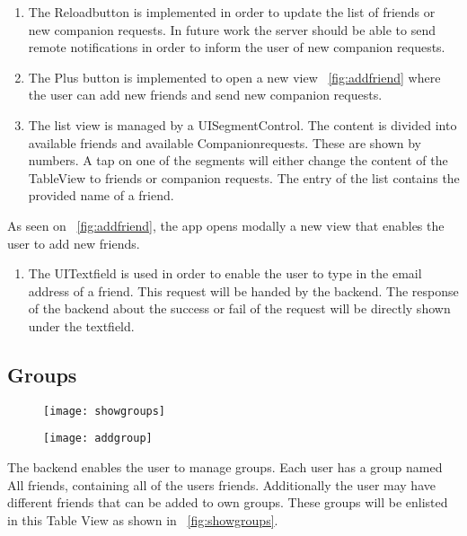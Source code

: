 \begin{enumerate}
\item The Reloadbutton is implemented in order to update the list of friends or new companion requests. In future work the server should be able to send remote notifications in order to inform the user of new companion requests.

\item The Plus button is implemented to open a new view ~\ref{fig:addfriend} where the user can add new friends and send new companion requests.

\item The list view is managed by a UISegmentControl. The content is divided into available friends and available Companionrequests. These are shown by numbers. A tap on one of the segments will either change the content of the TableView to friends or companion requests. The entry of the list contains the provided name of a friend.
\end{enumerate}


As seen on ~\ref{fig:addfriend}, the app opens modally a new view that enables the user to add new friends.

\begin{enumerate}
\item The UITextfield is used in order to enable the user to type in the email address of a friend. This request will be handed by the backend. The response of the backend about the success or fail of the request will be directly shown under the textfield.
\end{enumerate}

\subsection{Groups}

\begin{figure}
\centering
\begin{minipage}{.5\textwidth}
  \centering
  \texttt{[image: showgroups]}
  \label{fig:showgroups}
\end{minipage}%
\begin{minipage}{.5\textwidth}
  \centering
  \texttt{[image: addgroup]}
  \label{fig:addgroup}
\end{minipage}
\end{figure}

The backend enables the user to manage groups. Each user has a group named All friends, containing all of the users friends. Additionally the user may have different friends that can be added to own groups. These groups will be enlisted in this Table View as shown in ~\ref{fig:showgroups}. 

